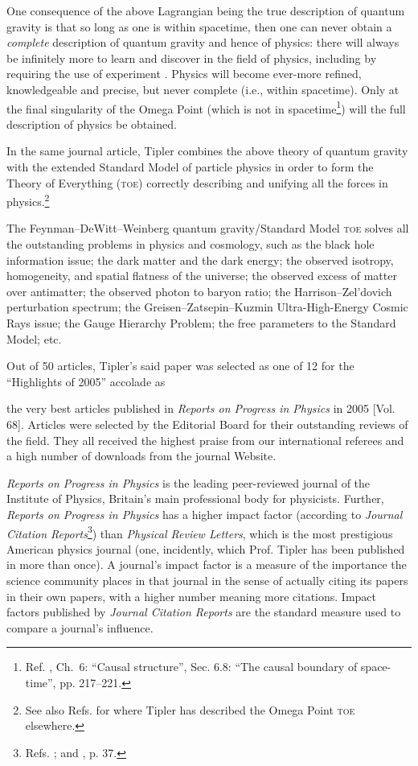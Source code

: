 \documentclass[letterpaper,12pt]{article}
\newenvironment{squote}
  {\small\quote}
  {\endquote\normalsize}
\begin{document}
One consequence of the above Lagrangian being the true description of quantum gravity is that so long as one is within spacetime, then one can never obtain a \emph{complete} description of quantum gravity and hence of physics: there will always be infinitely more to learn and discover in the field of physics, including by requiring the use of experiment \cite{Tipler2007}. Physics will become ever-more refined, knowledgeable and precise, but never complete (i.e., within spacetime). Only at the final singularity of the Omega Point (which is not in spacetime\footnote{Ref. , Ch.~6: ``Causal structure'', Sec. 6.8: ``The causal boundary of space-time'', pp. 217--221.}) will the full description of physics be obtained.

In the same journal article, Tipler combines the above theory of quantum gravity with the extended Standard Model of particle physics in order to form the Theory of Everything (\textsc{toe}) correctly describing and unifying all the forces in physics.\footnote{See also Refs.  for where Tipler has described the Omega Point \textsc{toe} elsewhere.}

The Feynman--DeWitt--Weinberg quantum gravity\slash Standard Model \textsc{toe} solves all the outstanding problems in physics and cosmology, such as the black hole information issue; the dark matter and the dark energy; the observed isotropy, homogeneity, and spatial flatness of the universe; the observed excess of matter over antimatter; the observed photon to baryon ratio; the Harrison--Zel'dovich perturbation spectrum; the Greisen--Zatsepin--Kuzmin Ultra-High-Energy Cosmic Rays issue; the Gauge Hierarchy Problem; the free parameters to the Standard Model; etc.

Out of 50 articles, Tipler's said paper was selected \cite{Palmer2006} as one of 12 for the ``Highlights of 2005'' accolade as

\begin{squote}
the very best articles published in \emph{Reports on Progress in Physics} in 2005 [Vol. 68]. Articles were selected by the Editorial Board for their outstanding reviews of the field. They all received the highest praise from our international referees and a high number of downloads from the journal Website.
\end{squote}

\emph{Reports on Progress in Physics} is the leading peer-reviewed journal of the Institute of Physics, Britain's main professional body for physicists. Further, \emph{Reports on Progress in Physics} has a higher impact factor (according to \emph{Journal Citation Reports}\footnote{Refs. ; and , p. 37.}) than \emph{Physical Review Letters}, which is the most prestigious American physics journal (one, incidently, which Prof. Tipler has been published in more than once). A journal's impact factor is a measure of the importance the science community places in that journal in the sense of actually citing its papers in their own papers, with a higher number meaning more citations. Impact factors published by \emph{Journal Citation Reports} are the standard measure used to compare a journal's influence.
\end{document}
